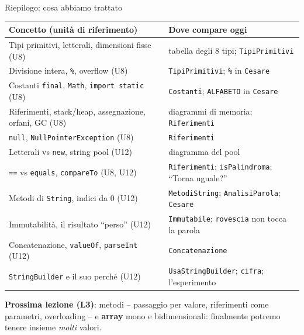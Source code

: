 \documentclass[10pt,aspectratio=169]{beamer}
\begin{document}
\begin{frame}{Riepilogo: cosa abbiamo trattato}
\small
\begin{center}
\renewcommand{\arraystretch}{1.25}
\begin{tabular}{|l|l|}
\hline
\textbf{Concetto (unità di riferimento)} & \textbf{Dove compare oggi} \\
\hline
Tipi primitivi, letterali, dimensioni fisse (U8) & tabella degli 8 tipi; \texttt{TipiPrimitivi} \\
\hline
Divisione intera, \texttt{\%}, overflow (U8) & \texttt{TipiPrimitivi}; \texttt{\%} in \texttt{Cesare} \\
\hline
Costanti \texttt{final}, \texttt{Math}, \texttt{import static} (U8) & \texttt{Costanti}; \texttt{ALFABETO} in \texttt{Cesare} \\
\hline
Riferimenti, stack/heap, assegnazione, orfani, GC (U8) & diagrammi di memoria; \texttt{Riferimenti} \\
\hline
\texttt{null}, \texttt{NullPointerException} (U8) & \texttt{Riferimenti} \\
\hline
Letterali vs \texttt{new}, string pool (U12) & diagramma del pool \\
\hline
\texttt{==} vs \texttt{equals}, \texttt{compareTo} (U8, U12) & \texttt{Riferimenti}; \texttt{isPalindroma}; ``Torna uguale?'' \\
\hline
Metodi di \texttt{String}, indici da 0 (U12) & \texttt{MetodiString}; \texttt{AnalisiParola}; \texttt{Cesare} \\
\hline
Immutabilità, il risultato ``perso'' (U12) & \texttt{Immutabile}; \texttt{rovescia} non tocca la parola \\
\hline
Concatenazione, \texttt{valueOf}, \texttt{parseInt} (U12) & \texttt{Concatenazione} \\
\hline
\texttt{StringBuilder} e il suo perché (U12) & \texttt{UsaStringBuilder}; \texttt{cifra}; l'esperimento \\
\hline
\end{tabular}
\end{center}

\vspace{0.2cm}
\textbf{Prossima lezione (L3)}: metodi -- passaggio per valore, riferimenti come parametri, overloading -- e \textbf{array} mono e bidimensionali: finalmente potremo tenere insieme \emph{molti} valori.
\end{frame}
\end{document}
